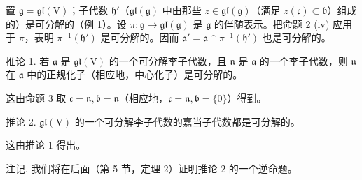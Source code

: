 置 \(\mathfrak{g} = \mathfrak{gl}(\mathrm{V})\)；子代数 \(\mathfrak{h}'\)（\(\mathfrak{gl}(\mathfrak{g})\) 中由那些 \(z \in \mathfrak{gl}(\mathfrak{g})\)（满足 \(z(\mathfrak{c}) \subset \mathfrak{b}\)）组成的）是可分解的（例 1）。设 \(\pi : \mathfrak{g} \to \mathfrak{gl}(\mathfrak{g})\) 是 \(\mathfrak{g}\) 的伴随表示。把命题 2 (iv) 应用于 \(\pi\)，表明 \(\pi^{-1}(\mathfrak{h}')\) 是可分解的。因而 \(\mathfrak{a}' = \mathfrak{a} \cap \pi^{-1}(\mathfrak{h}')\) 也是可分解的。

推论 1. 若 \(\mathfrak{a}\) 是 \(\mathfrak{gl}(\mathrm{V})\) 的一个可分解李子代数，且 \(\mathfrak{n}\) 是 \(\mathfrak{a}\) 的一个李子代数，则 \(\mathfrak{n}\) 在 \(\mathfrak{a}\) 中的正规化子（相应地，中心化子）是可分解的。

这由命题 3 取 \(\mathfrak{c} = \mathfrak{n},\mathfrak{b} = \mathfrak{n}\)（相应地，\(\mathfrak{c} = \mathfrak{n},\mathfrak{b} = \{0\}\)）得到。

推论 2. \(\mathfrak{gl}(\mathrm{V})\) 的一个可分解李子代数的嘉当子代数都是可分解的。

这由推论 1 得出。

注记. 我们将在后面（第 5 节，定理 2）证明推论 2 的一个逆命题。


